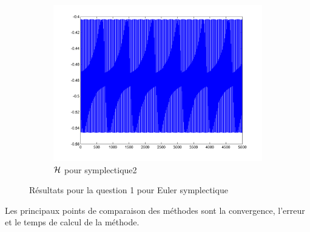\begin{figure}[!ht]
\begin{subfigure}[b]{0.3\textwidth}
    \includegraphics[width=\textwidth]{images/Q1_symplectique2_H.png}
    \caption{$\mathcal{H}$ pour symplectique2}
    \label{fig:q1_symplectique2_H}
  \end{subfigure}
  \caption{Résultats pour la question 1 pour Euler symplectique}
  \label{fig:q1_sym}
\end{figure}


Les principaux points de comparaison des méthodes sont la convergence, l'erreur et le temps de calcul de la méthode.

